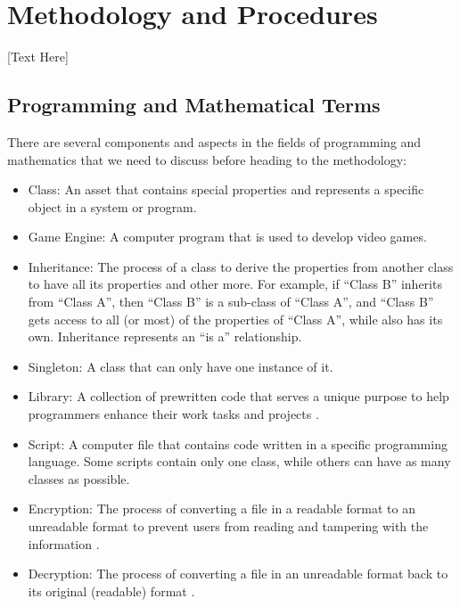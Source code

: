 
\section{Methodology and Procedures}

[Text Here]

\subsection{Programming and Mathematical Terms}
There are several components and aspects in the fields of programming and mathematics that we need to discuss before heading to the methodology:
\begin{itemize}
    \item {Class: An asset that contains special properties and represents a specific object in a system or program.}
    
    \item{Game Engine: A computer program that is used to develop video games.}
    
    \item{Inheritance: The process of a class to derive the properties from another class to have all its properties and other more. For example, if “Class B” inherits from “Class A”, then “Class B” is a sub-class of “Class A”, and “Class B” gets access to all (or most) of the properties of “Class A”, while also has its own. Inheritance represents an “is a” relationship.}
    
    \item{Singleton: A class that can only have one instance of it.}
    
    \item{Library: A collection of prewritten code that serves a unique purpose to help programmers enhance their work tasks and projects \cite{LibraryDef}.}
    
    \item{Script: A computer file that contains code written in a specific programming language. Some scripts contain only one class, while others can have as many classes as possible.}
    
    \item{Encryption: The process of converting a file in a readable format to an unreadable format to prevent users from reading and tampering with the information \cite{EncryptionAndDecryption}.}
    
    \item{Decryption: The process of converting a file in an unreadable format back to its original (readable) format \cite{EncryptionAndDecryption}.}
    

\end{itemize}
